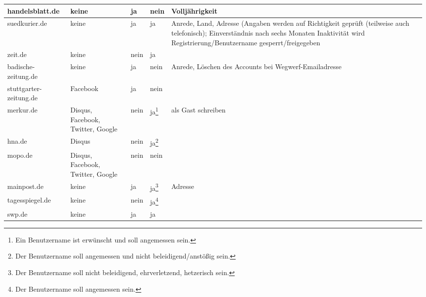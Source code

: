 \begin{landscape}
\begin{longtable}{l|p{28mm}p{20mm}p{20mm}p{90mm}}
  handelsblatt.de & %
    keine & ja & nein &
    Volljährigkeit \\\hline

  suedkurier.de & %
    keine & ja & ja &
    Anrede, Land, Adresse (Angaben werden auf Richtigkeit geprüft (teilweise
    auch telefonisch); Einverständnis nach sechs Monaten Inaktivität wird
    Registrierung/Benutzername gesperrt/freigegeben \\\hline

  zeit.de & %
    keine & nein & ja &
    \\\hline

  badische-zeitung.de & %
    keine & ja & nein &
    Anrede, Löschen des Accounts bei Wegwerf-Emailadresse
    \\\hline

  stuttgarter-zeitung.de & %
    Facebook & ja & nein &
    \\\hline

  merkur.de & %
    Disqus, Facebook, Twitter, Google & nein & ja\footnote{Ein Benutzername ist erwünscht und soll angemessen sein.} &
    als Gast schreiben \\\hline

  hna.de & %
    Disqus & nein & ja\footnote{Der Benutzername soll angemessen und nicht beleidigend/anstößig sein.} &
    \\\hline

  mopo.de & %
    Disqus, Facebook, Twitter, Google & nein & nein &
    \\\hline

  mainpost.de & %
    keine & ja & ja\footnote{Der Benutzername soll nicht beleidigend, ehrverletzend, hetzerisch sein.} &
    Adresse \\\hline

  tagesspiegel.de & %
    keine & nein & ja\footnote{Der Benutzername soll angemessen sein.} &
    \\\hline

  swp.de & %
    keine & ja & ja &
    \\ \hline

\end{longtable}
\end{landscape}


